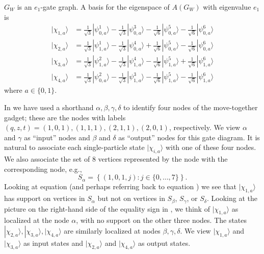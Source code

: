 \documentclass[../thesis-main/thesis-main]{subfiles}
\begin{document}
\begin{lemma}
$G_{W}$ is an $e_{1}$-gate graph. A basis for the eigenspace
of $A(G_{W})$ with eigenvalue $e_1$ is 
\begin{align}
|\chi_{1,a}\rangle & =\frac{1}{\sqrt{3}}|\psi_{0,a}^{1}\rangle-\frac{1}{\sqrt{3}}|\psi_{0,a}^{3}\rangle-\frac{1}{\sqrt{6}}|\psi_{0,a}^{5}\rangle-\frac{1}{\sqrt{6}}|\psi_{0,a}^{6}\rangle\label{eq:chi_alpha}\\
|\chi_{2,a}\rangle & =\frac{1}{\sqrt{3}}|\psi_{1,a}^{1}\rangle-\frac{1}{\sqrt{3}}|\psi_{0,a}^{4}\rangle+\frac{1}{\sqrt{6}}|\psi_{0,a}^{5}\rangle-\frac{1}{\sqrt{6}}|\psi_{0,a}^{6}\rangle\label{eq:chi_beta}\\
|\chi_{3,a}\rangle & =\frac{1}{\sqrt{3}}|\psi_{1,a}^{2}\rangle-\frac{1}{\sqrt{3}}|\psi_{1,a}^{4}\rangle-\frac{1}{\sqrt{6}}|\psi_{1,a}^{5}\rangle+\frac{1}{\sqrt{6}}|\psi_{1,a}^{6}\rangle\label{eq:chi_gamma}\\
|\chi_{4,a}\rangle & =\frac{1}{\sqrt{3}}|\psi_{0,a}^{2}\rangle-\frac{1}{\sqrt{3}}|\psi_{1,a}^{3}\rangle-\frac{1}{\sqrt{6}}|\psi_{1,a}^{5}\rangle-\frac{1}{\sqrt{6}}|\psi_{1,a}^{6}\rangle\label{eq:chi_delta}
\end{align}
where $a\in\{0,1\}$. 
\end{lemma}

In  we have used a shorthand $\alpha,\beta,\gamma,\delta$ to identify four nodes of the move-together gadget; these are the nodes with labels $(q,z,t)=(1,0,1),(1,1,1),(2,1,1),(2,0,1)$, respectively. We view $\alpha$ and $\gamma$ as ``input'' nodes and $\beta$ and $\delta$ as ``output'' nodes for this gate diagram. It is natural to associate each single-particle state $|\chi_{i,a}\rangle$ with one of these four nodes.  We also associate the set of 8 vertices represented by the node with the corresponding node, e.g.,
\[
  S_{\alpha}=\left\{ (1,0,1,j)\colon j\in\{0,\ldots,7\}\right\} .
\]
Looking at equation  (and perhaps referring back to equation ) we see that $|\chi_{1,a}\rangle$ has support on vertices in $S_{\alpha}$ but not on vertices in $S_{\beta}$, $S_{\gamma}$, or $S_{\delta}$. Looking at the picture on the right-hand side of the equality sign in , we think of $|\chi_{1,a}\rangle$ as localized at the node $\alpha$, with no support on the other three nodes. The states $|\chi_{2,a}\rangle,|\chi_{3,a}\rangle,|\chi_{4,a}\rangle$ are similarly localized at nodes $\beta,\gamma,\delta$. We view $|\chi_{1,a}\rangle$ and $|\chi_{3,a}\rangle$ as input states and $|\chi_{2,a}\rangle$ and $|\chi_{4,a}\rangle$ as output states.
\end{document}
